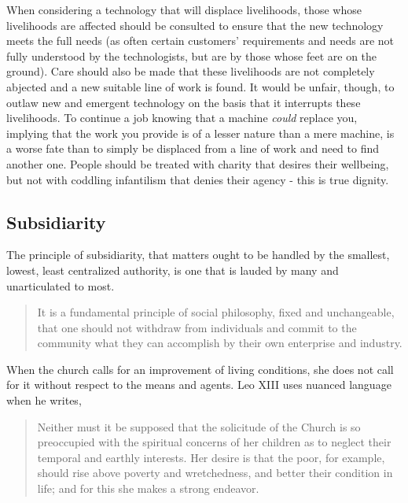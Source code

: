 \documentclass[letterpaper]{article}
\begin{document}
When considering a technology that will displace livelihoods, those whose livelihoods are affected should be consulted to ensure that the new technology meets the full needs (as often certain customers' requirements and needs are not fully understood by the technologists, but are by those whose feet are on the ground). Care should also be made that these livelihoods are not completely abjected and a new suitable line of work is found. It would be unfair, though, to outlaw new and emergent technology on the basis that it interrupts these livelihoods. To continue a job knowing that a machine \textit{could} replace you, implying that the work you provide is of a lesser nature than a mere machine, is a worse fate than to simply be displaced from a line of work and need to find another one. People should be treated with charity that desires their wellbeing, but not with coddling infantilism that denies their agency - this is true dignity.

\subsection{Subsidiarity}

The principle of subsidiarity, that matters ought to be handled by the smallest, lowest, least centralized authority, is one that is lauded by many and unarticulated to most.

\begin{quote}
  It is a fundamental principle of social philosophy, fixed and unchangeable, that one should not withdraw from individuals and commit to the community what they can accomplish by their own enterprise and industry.
\end{quote}

When the church calls for an improvement of living conditions, she does not call for it without respect to the means and agents. Leo XIII uses nuanced language when he writes,

\begin{quote}
  Neither must it be supposed that the solicitude of the Church is so preoccupied with the spiritual concerns of her children as to neglect their temporal and earthly interests. Her desire is that the poor, for example, should rise above poverty and wretchedness, and better their condition in life; and for this she makes a strong endeavor.
\end{quote}
\end{document}

